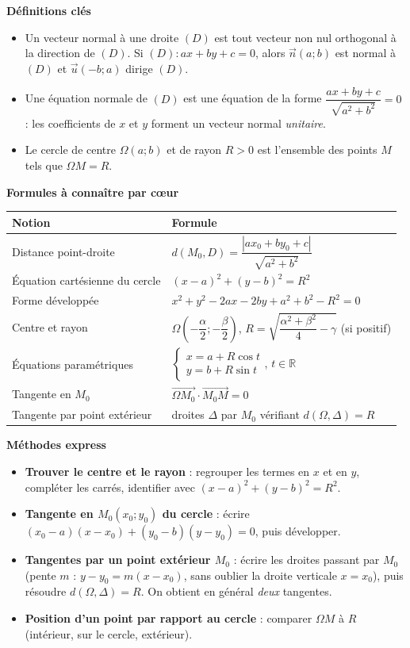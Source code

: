 \documentclass[11pt]{article}
\newcommand{\cle}[1]{{\popxbold\color{popdark}#1}}
\begin{document}
\begin{bilan}
\textbf{Définitions clés}
\begin{itemize}
\item Un \cle{vecteur normal} à une droite $(D)$ est tout vecteur non nul orthogonal à la direction de $(D)$. Si $(D):ax+by+c=0$, alors $\vec{n}(a;b)$ est normal à $(D)$ et $\vec{u}(-b;a)$ dirige $(D)$.
\item Une \cle{équation normale} de $(D)$ est une équation de la forme $\dfrac{ax+by+c}{\sqrt{a^2+b^2}}=0$ : les coefficients de $x$ et $y$ forment un vecteur normal \emph{unitaire}.
\item Le \cle{cercle} de centre $\Omega(a;b)$ et de rayon $R>0$ est l'ensemble des points $M$ tels que $\Omega M=R$.
\end{itemize}

\textbf{Formules à connaître par c\oe ur}
\begin{center}
\begin{tabularx}{\linewidth}{|l|X|}\hline
\rowcolor{popblueL} \textbf{Notion} & \textbf{Formule} \\ \hline
Distance point-droite & $d(M_0,D)=\dfrac{|ax_0+by_0+c|}{\sqrt{a^2+b^2}}$ \\ \hline
Équation cartésienne du cercle & $(x-a)^2+(y-b)^2=R^2$ \\ \hline
Forme développée & $x^2+y^2-2ax-2by+a^2+b^2-R^2=0$ \\ \hline
Centre et rayon & $\Omega\left(-\dfrac{\alpha}{2};-\dfrac{\beta}{2}\right)$, \quad $R=\sqrt{\dfrac{\alpha^2+\beta^2}{4}-\gamma}$ (si positif) \\ \hline
Équations paramétriques & $\begin{cases} x=a+R\cos t \\ y=b+R\sin t \end{cases}$, $t\in\mathbb{R}$ \\ \hline
Tangente en $M_0$ & $\overrightarrow{\Omega M_0}\cdot\overrightarrow{M_0M}=0$ \\ \hline
Tangente par point extérieur & droites $\Delta$ par $M_0$ vérifiant $d(\Omega,\Delta)=R$ \\ \hline
\end{tabularx}
\end{center}

\textbf{Méthodes express}
\begin{itemize}
\item \textbf{Trouver le centre et le rayon} : regrouper les termes en $x$ et en $y$, compléter les carrés, identifier avec $(x-a)^2+(y-b)^2=R^2$.
\item \textbf{Tangente en $M_0(x_0;y_0)$ du cercle} : écrire $(x_0-a)(x-x_0)+(y_0-b)(y-y_0)=0$, puis développer.
\item \textbf{Tangentes par un point extérieur $M_0$} : écrire les droites passant par $M_0$ (pente $m$ : $y-y_0=m(x-x_0)$, sans oublier la droite verticale $x=x_0$), puis résoudre $d(\Omega,\Delta)=R$. On obtient en général \emph{deux} tangentes.
\item \textbf{Position d'un point par rapport au cercle} : comparer $\Omega M$ à $R$ (intérieur, sur le cercle, extérieur).
\end{itemize}
\end{bilan}
\end{document}
